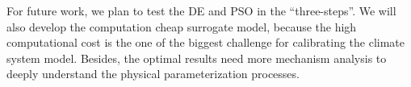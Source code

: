 \documentclass[gmd, manuscript]{copernicus}
\begin{document}
For future work, we plan to test the DE and PSO in the ``three-steps''. We will also develop the computation cheap surrogate model, because the high computational cost is the one of the biggest challenge for calibrating the climate system model. Besides, the optimal results need more mechanism analysis to deeply understand the physical parameterization processes.  
















\clearpage
\end{document}
